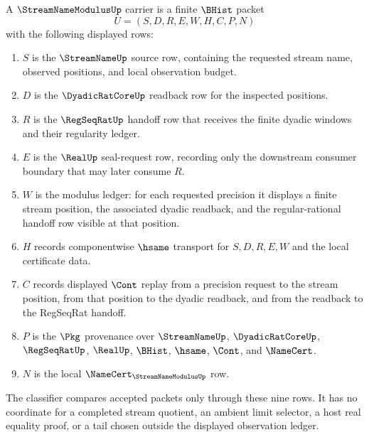 \begin{definition}
\label{def:streamname-modulus-carrier}
A $\StreamNameModulusUp$ carrier is a finite $\BHist$ packet
$$
U=(S,D,R,E,W,H,C,P,N)
$$
with the following displayed rows:
\begin{enumerate}
\item $S$ is the $\StreamNameUp$ source row, containing the requested stream
name, observed positions, and local observation budget.
\item $D$ is the $\DyadicRatCoreUp$ readback row for the inspected positions.
\item $R$ is the $\RegSeqRatUp$ handoff row that receives the finite dyadic
windows and their regularity ledger.
\item $E$ is the $\RealUp$ seal-request row, recording only the downstream
consumer boundary that may later consume $R$.
\item $W$ is the modulus ledger: for each requested precision it displays a
finite stream position, the associated dyadic readback, and the regular-rational
handoff row visible at that position.
\item $H$ records componentwise $\hsame$ transport for $S,D,R,E,W$ and the
local certificate data.
\item $C$ records displayed $\Cont$ replay from a precision request to the
stream position, from that position to the dyadic readback, and from the
readback to the RegSeqRat handoff.
\item $P$ is the $\Pkg$ provenance over $\StreamNameUp$, $\DyadicRatCoreUp$,
$\RegSeqRatUp$, $\RealUp$, $\BHist$, $\hsame$, $\Cont$, and $\NameCert$.
\item $N$ is the local $\NameCert_{\StreamNameModulusUp}$ row.
\end{enumerate}
The classifier compares accepted packets only through these nine rows. It has
no coordinate for a completed stream quotient, an ambient limit selector, a
host real equality proof, or a tail chosen outside the displayed observation
ledger.
\end{definition}

